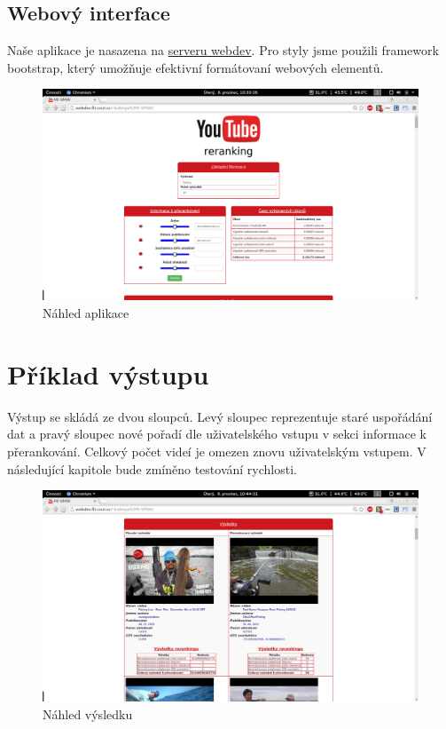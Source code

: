 \documentclass[a4paper,11pt]{article}
\begin{document}
\subsection{Webový interface}
\par Naše aplikace je nasazena na \href{http://webdev.fit.cvut.cz/~kubinpe5/MI-VMW/}{serveru webdev}. Pro styly jsme použili framework bootstrap, který umožňuje efektivní formátovaní webových elementů. 
\begin{figure}[h]
	\centering
	\includegraphics[width=\textwidth]{obrazova_priloha/sample_project.png}
	\caption{Náhled aplikace}
\end{figure}

\section{Příklad výstupu}
\par Výstup se skládá ze dvou sloupců. Levý sloupec reprezentuje staré uspořádání dat a pravý sloupec nové pořadí dle uživatelského vstupu v sekci informace k přerankování. Celkový počet videí je omezen znovu uživatelským vstupem. V následující kapitole bude zmíněno testování rychlosti.
\begin{figure}[h]
	\centering
	\includegraphics[width=\textwidth]{obrazova_priloha/sample_result.png}
	\caption{Náhled výsledku}
\end{figure}
\end{document}
